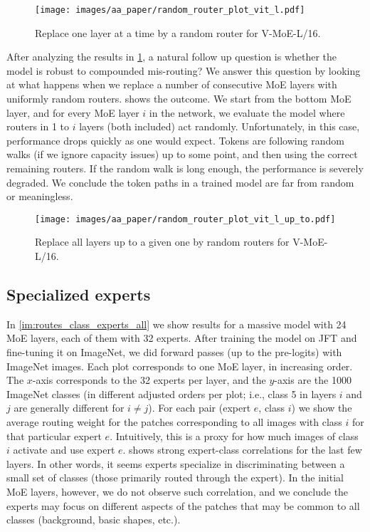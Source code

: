 \documentclass{article}
\newcommand{\abbv}{{V-MoE}}
\begin{document}
\begin{figure}[h]
\centering
\texttt{[image: images/aa\_paper/random\_router\_plot\_vit\_l.pdf]}
\caption{Replace one layer at a time by a random router for \abbv{}-L/16.}
\label{im:random_router_one}
\end{figure}

After analyzing the results in \cref{im:random_router_one}, a natural follow up question is whether the model is robust to compounded mis-routing?
We answer this question by looking at what happens when we replace a number of consecutive MoE layers with uniformly random routers.
 shows the outcome.
We start from the bottom MoE layer, and for every MoE layer $i$ in the network, we evaluate the model where routers in 1 to $i$ layers (both included) act randomly.
Unfortunately, in this case, performance drops quickly as one would expect.
Tokens are following random walks (if we ignore capacity issues) up to some point, and then using the correct remaining routers. If the random walk is long enough, the performance is severely degraded.
We conclude the token paths in a trained model are far from random or meaningless.

\begin{figure}[h]
\centering
\texttt{[image: images/aa\_paper/random\_router\_plot\_vit\_l\_up\_to.pdf]}
\caption{Replace all layers up to a given one by random routers for \abbv{}-L/16.}
\label{im:random_router_up_to}
\end{figure}

\subsection{Specialized experts}
\label{app_analysis_specialized_experts}


In \cref{im:routes_class_experts_all} we show results for a massive model with 24 MoE layers, each of them with 32 experts.
After training the model on JFT and fine-tuning it on ImageNet, we did forward passes (up to the pre-logits) with ImageNet images.
Each plot corresponds to one MoE layer, in increasing order.
The $x$-axis corresponds to the 32 experts per layer, and the $y$-axis are the 1000 ImageNet classes (in different adjusted orders per plot; i.e., class 5 in layers $i$ and $j$ are generally different for $i \neq j$).
For each pair (expert $e$, class $i$) we show the average routing weight for the patches corresponding to all images with class $i$ for that particular expert $e$.
Intuitively, this is a proxy for how much images of class $i$ activate and use expert $e$.
 shows strong expert-class correlations for the last few layers.
In other words, it seems experts specialize in discriminating between a small set of classes (those primarily routed through the expert).
In the initial MoE layers, however, we do not observe such correlation, and we conclude the experts may focus on different aspects of the patches that may be common to all classes (background, basic shapes, etc.).
\end{document}
